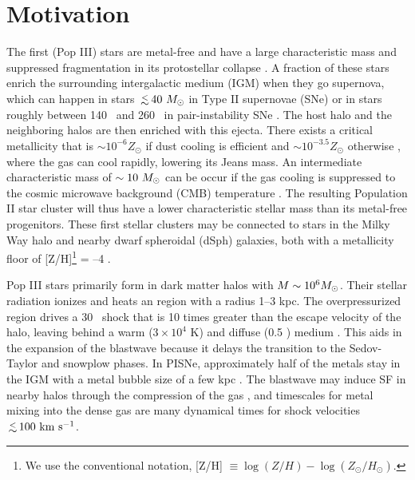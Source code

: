 \documentclass[apjl]{emulateapj}
\begin{document}

\section{Motivation}

The first (Pop III) stars are metal-free and have a large
characteristic mass and suppressed fragmentation in its protostellar
collapse \citep{ABN02, Bromm02_P3, OShea07a}.  A fraction of these
stars enrich the surrounding intergalactic medium (IGM) when they go
supernova, which can happen in stars $\lsim 40~\Ms$ in Type II
supernovae (SNe) or in stars roughly between 140 \Ms~and 260 \Ms~in
pair-instability SNe \citep[PISNe;][]{2002ApJ...567..532H}.  The host
halo and the neighboring halos are then enriched with this ejecta.
There exists a critical metallicity that is $\sim 10^{-6} Z_\odot$ if
dust cooling is efficient \citep{Omukai05, Schneider06_Frag, clark08}
and $\sim 10^{-3.5} Z_\odot$ otherwise \citep{Bromm01,
  2009ApJ...691..441S}, where the gas can cool rapidly, lowering its
Jeans mass.  An intermediate characteristic mass of $\sim10~\Ms$ can
be occur if the gas cooling is suppressed to the cosmic microwave
background (CMB) temperature \citep{Larson98, Tumlinson07_IMF,
  2009ApJ...691..441S}.  The resulting Population II star cluster will
thus have a lower characteristic stellar mass than its metal-free
progenitors.  These first stellar clusters may be connected to stars
in the Milky Way halo and nearby dwarf spheroidal (dSph) galaxies,
both with a metallicity floor of [Z/H]\footnote{We use the
  conventional notation, [Z/H] $\equiv \log(Z/H) -
  \log(Z_\odot/H_\odot)$.} = --4 \citep{Beers05, Tafelmeyer10,
  Frebel10_Obs}.

Pop III stars primarily form in dark matter halos with $M \sim 10^6
\Ms$.  Their stellar radiation ionizes and heats an  region
with a radius 1--3 kpc.  The overpressurized  region drives
a 30 \kms~shock that is 10 times greater than the escape velocity of
the halo, leaving behind a warm ($3 \times 10^4$ K) and diffuse (0.5
\cubecm) medium \citep{Kitayama04, Whalen04, Abel07}.  This aids in
the expansion of the blastwave because it delays the transition to the
Sedov-Taylor and snowplow phases.  In PISNe, approximately half of the
metals stay in the IGM with a metal bubble size of a few kpc
\citep{Wise08_Gal, Greif10}.  The blastwave may induce SF in nearby
halos through the compression of the gas \citep{Ferrara98}, and
timescales for metal mixing into the dense gas are many dynamical
times \citep{Cen08} for shock velocities $\lsim100~\kms$.
\end{document}
